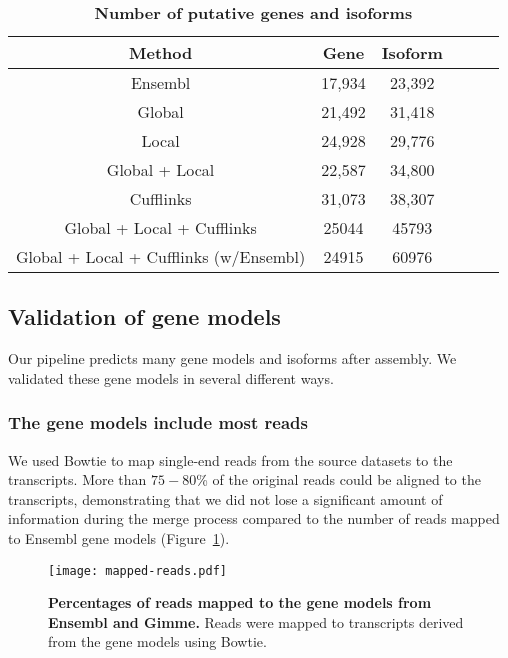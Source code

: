 \begin{table}
\caption{
\textbf{Number of putative genes and isoforms}}
\begin{center}
\begin{tabular}{cccccc}
\hline
Method& Gene & Isoform \\ 
\hline
Ensembl & 17,934 & 23,392 \\
Global & 21,492 & 31,418 \\
Local & 24,928 & 29,776 \\
Global + Local & 22,587 & 34,800 \\
Cufflinks & 31,073 & 38,307 \\
Global + Local + Cufflinks & 25044 & 45793 \\
Global + Local + Cufflinks (w/Ensembl) & 24915 & 60976 \\
\hline
\end{tabular}
\label{genes_transcripts}
\end{center}
\end{table}

\subsection{Validation of gene models}

Our pipeline predicts many gene models and isoforms after assembly.  We
validated these gene models in several different ways.

\subsubsection{The gene models include most reads}

We used Bowtie to map single-end reads from the source datasets to the
transcripts.  More than $75-80$\% of the original reads could be aligned to the
transcripts, demonstrating that we did not lose a significant amount of
information during the merge process compared to the number of reads mapped to
Ensembl gene models (Figure~\ref{mapped-reads}).

\begin{figure}[!ht]
\begin{center}
\texttt{[image: mapped-reads.pdf]}
\end{center}
\caption{
    \textbf{Percentages of reads mapped to the gene models from
    Ensembl and Gimme.}
    Reads were mapped to transcripts derived from the gene models
    using Bowtie.
}
\label{mapped-reads}
\end{figure}

